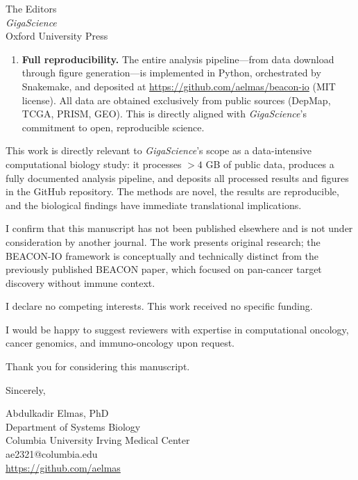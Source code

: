 \documentclass[12pt]{letter}
\begin{document}
\begin{letter}{
  The Editors\\
  \textit{GigaScience}\\
  Oxford University Press
}
\begin{enumerate}
  \item \textbf{Full reproducibility.} The entire analysis pipeline---from data download through figure generation---is implemented in Python, orchestrated by Snakemake, and deposited at \url{https://github.com/aelmas/beacon-io} (MIT license). All data are obtained exclusively from public sources (DepMap, TCGA, PRISM, GEO). This is directly aligned with \textit{GigaScience}'s commitment to open, reproducible science.
\end{enumerate}

This work is directly relevant to \textit{GigaScience}'s scope as a data-intensive computational biology study: it processes $> 4$ GB of public data, produces a fully documented analysis pipeline, and deposits all processed results and figures in the GitHub repository. The methods are novel, the results are reproducible, and the biological findings have immediate translational implications.

I confirm that this manuscript has not been published elsewhere and is not under consideration by another journal. The work presents original research; the BEACON-IO framework is conceptually and technically distinct from the previously published BEACON paper, which focused on pan-cancer target discovery without immune context.

I declare no competing interests. This work received no specific funding.

I would be happy to suggest reviewers with expertise in computational oncology, cancer genomics, and immuno-oncology upon request.

Thank you for considering this manuscript.

\closing{Sincerely,}

\vspace{2cm}
Abdulkadir Elmas, PhD\\
Department of Systems Biology\\
Columbia University Irving Medical Center\\
ae2321@columbia.edu\\
\url{https://github.com/aelmas}

\end{letter}
\end{document}
